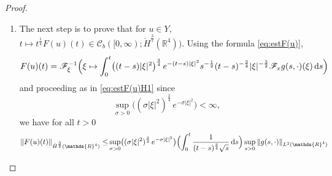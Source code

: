 \documentclass[a4paper, 12pt]{article}
\theoremstyle{plain}
\theoremstyle{definition}
\theoremstyle{remark}
\numberwithin{equation}{section}
\begin{document}
\begin{proof}
\begin{enumerate}
By the Sobolev embedding $\dot H^{\frac{3}{2}}({\mathds{R}}^4)\hookrightarrow L^8({\mathds{R}}^4)$, we have that
$t\mapsto t^{\frac{1}{2}}|u(t)|^2$ belongs to ${\mathscr{C}}_b([0,\infty);L^4({\mathds{R}}^4))$. If we multiply this by
$u\in Y\subset {\mathscr{C}}_b([0,\infty);\dot H^1({\mathds{R}}^4))\hookrightarrow {\mathscr{C}}_b([0,\infty);L^4({\mathds{R}}^4))$, 
we obtain that $g:t\mapsto t^{\frac{1}{2}}|u(t)|^2u(t)$ belongs to ${\mathscr{C}}_b([0,\infty);L^2({\mathds{R}}^4))$ with the estimate
\[
\sup_{t>0}\bigl\|t^{\frac{1}{2}}|u(t)|^2u(t)\bigr\|_{L^2({\mathds{R}}^4)}\le \|u\|_Y^3.
\]
We now use this estimate on $g$ to estimate $F(u)$ in ${\mathscr{C}}_b([0,\infty);\dot H^1({\mathds{R}}^4))$: for $t\ge 0$,
%
\begin{align}
F(u)(t)=&{\mathscr{F}}_\xi^{-1}\Bigl(\xi\mapsto \int_0^t e^{-(t-s)|\xi|^2} s^{-\frac{1}{2}} {\mathscr{F}}_xg(s,\cdot)(\xi)\,{\rm d}s\Bigr)
\label{eq:estF(u)}\\
=&{\mathscr{F}}_\xi^{-1}\Bigl(\xi\mapsto \int_0^t \sqrt{(t-s)|\xi|^2}\, e^{-(t-s)|\xi|^2} s^{-\frac{1}{2}} (t-s)^{-\frac{1}{2}}
|\xi|^{-1}{\mathscr{F}}_xg(s,\cdot)(\xi)\,{\rm d}s\Bigr).\nonumber
\end{align}
%
We have then for all $t\ge0$
%
\begin{align}
\|F(u)(t)\|_{\dot H^1({\mathds{R}}^4)}\le& \sup_{\sigma >0} \bigl(\sqrt{\sigma |\xi|^2}\, e^{-\sigma|\xi|^2}\bigr) 
\Bigl(\int_0^t \frac{1}{\sqrt{t-s}\sqrt{s}}\,{\rm d}s\Bigr)\sup_{s>0}\|g(s,\cdot)\|_{L^2({\mathds{R}}^4)} \nonumber\\
\lesssim & \Bigl(\int_0^1\frac{1}{\sqrt{1-\tau}\sqrt{\tau}}\,{\rm d}\tau\Bigr)\|u\|_Y^3. \label{eq:estF(u)H1}
\end{align}
%
\item
The next step is to prove that for $u\in Y$, $t\mapsto t^{\frac{1}{4}}F(u)(t)\in {\mathscr{C}}_b([0,\infty);\dot H^{\frac{3}{2}}({\mathds{R}}^4))$.
Using the formula \eqref{eq:estF(u)}, 
\[
F(u)(t)={\mathscr{F}}_\xi^{-1}\Bigl(\xi\mapsto \int_0^t \bigl((t-s)|\xi|^2\bigr)^{\frac{3}{4}}\, e^{-(t-s)|\xi|^2} s^{-\frac{1}{2}} (t-s)^{-\frac{3}{4}}
|\xi|^{-\frac{3}{2}}{\mathscr{F}}_xg(s,\cdot)(\xi)\,{\rm d}s\Bigr)
\]
and proceeding as in \eqref{eq:estF(u)H1} since 
\[
\sup_{\sigma >0} \bigl((\sigma |\xi|^2)^{\frac{3}{4}}\, e^{-\sigma|\xi|^2}\bigr) <\infty,
\]
we have for all $t>0$
%
\begin{align*}
\|F(u)(t)\|_{\dot H^{\frac{3}{2}}({\mathds{R}}^4)}\le& \sup_{\sigma >0} \bigl((\sigma |\xi|^2)^{\frac{3}{4}}\, e^{-\sigma|\xi|^2}\bigr) 
\Bigl(\int_0^t \frac{1}{(t-s)^{\frac{3}{4}}\sqrt{s}}\,{\rm d}s\Bigr)\sup_{s>0}\|g(s,\cdot)\|_{L^2({\mathds{R}}^4)}\\

\end{align*}
\end{enumerate}
\end{proof}
\end{document}
